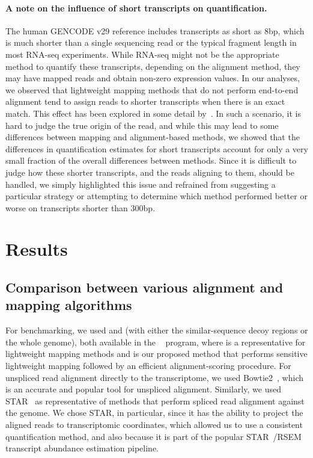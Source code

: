 \paragraph{A note on the influence of short transcripts on quantification.} 
The human GENCODE v29 reference includes transcripts as short as 8bp, which is
much shorter than a single sequencing read or the typical fragment length in
most RNA-seq experiments. While RNA-seq might not be the appropriate method to
quantify these transcripts, depending on the alignment method, they may have
mapped reads and obtain non-zero expression values. In our analyses, we observed
that lightweight mapping methods that do not perform end-to-end alignment tend
to assign reads to shorter transcripts when there is an exact match. This effect
has been explored in some detail by~\citet{wu2018limitations}. In such a
scenario, it is hard to judge the true origin of the read, and while this may
lead to some differences between mapping and alignment-based methods, we showed that the
differences in quantification estimates for short transcripts account for only a
very small fraction of the overall differences between methods. 
Since it is difficult to judge how these shorter transcripts, and the
reads aligning to them, should be handled, we simply highlighted this issue and
refrained from suggesting a particular strategy or attempting to determine which
method performed better or worse on transcripts shorter than $300$bp. 

\section{Results}
\subsection{Comparison between various alignment and mapping algorithms}
\label{subsec:overview}

For benchmarking, we used \qm and \hsa (with either the similar-sequence decoy regions or the whole genome), 
both available in the \salmon~\citep{salmon} program, where
\qm is a representative for lightweight mapping methods and \hsa is our proposed
method that performs sensitive lightweight mapping
followed by an efficient alignment-scoring procedure. For unspliced read
alignment directly to the transcriptome, we used Bowtie2~\citep{bowtie2}, which
is an accurate and popular tool for unspliced alignment. Similarly, we used
STAR~\citep{star} as representative of methods that perform spliced read
alignment against the genome. We chose STAR, in particular, since it has the
ability to project the aligned reads to transcriptomic coordinates, which allowed
us to use a consistent quantification method, and also because it is part of the
popular STAR~\citep{star}/RSEM~\citep{li2011rsem} transcript abundance estimation
pipeline.

